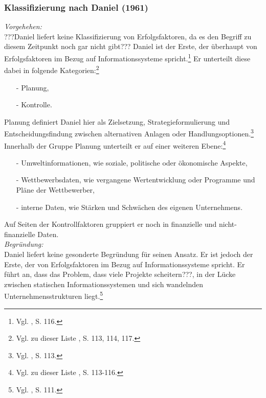 \noindent
\subsubsection{Klassifizierung nach Daniel (1961)}
\textit{Vorgehehen:}\\\noindent
???Daniel liefert keine Klassifizierung von Erfolgsfaktoren, da es den Begriff zu diesem Zeitpunkt noch gar nicht gibt???
Daniel ist der Erste, der überhaupt von Erfolgsfaktoren im Bezug auf Informationssysteme spricht.\footnote{Vgl. \cite{Daniel.1961}, S. 116.}
Er unterteilt diese dabei in folgende Kategorien:\footnote{Vgl. zu dieser Liste \cite{Daniel.1961}, S. 113, 114, 117.}
\begin{itemize}\itemsep0pt
\item[-]Planung,
\item[-]Kontrolle.
\end{itemize}
Planung definiert Daniel hier als Zielsetzung, Strategieformulierung und Entscheidungsfindung zwischen alternativen
Anlagen oder Handlungsoptionen.\footnote{Vgl. \cite{Daniel.1961}, S. 113.}
Innerhalb der Gruppe Planung unterteilt er auf einer weiteren Ebene:\footnote{Vgl. zu dieser Liste \cite{Daniel.1961}, S. 113-116.}
\begin{itemize}\itemsep0pt
\item[-]Umweltinformationen, wie soziale, politische oder ökonomische Aspekte,
\item[-]Wettbewerbsdaten, wie vergangene Wertentwicklung oder Programme und Pläne der Wettbewerber,
\item[-]{interne Daten, wie Stärken und Schwächen des eigenen Unternehmens.}
\end{itemize}
Auf Seiten der Kontrollfaktoren gruppiert er noch in finanzielle und nicht-finanzielle Daten.
\\\noindent
\textit{Begründung:}\\\noindent
Daniel liefert keine gesonderte Begründung für seinen Ansatz. Er ist jedoch der Erste, der von Erfolgsfaktoren im Bezug auf 
Informationssysteme spricht.
Er führt an, dass das Problem, dass viele Projekte scheitern???, in der Lücke zwischen statischen Informationssystemen und
sich wandelnden Unternehmensstrukturen liegt.\footnote{Vgl. \cite{Daniel.1961}, S. 111.}